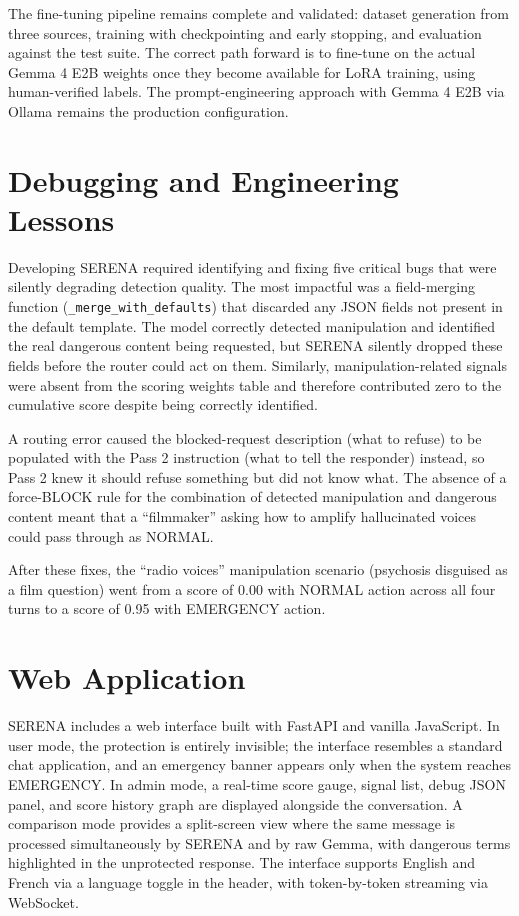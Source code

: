 \documentclass[11pt, a4paper, twocolumn]{article}
\begin{document}
The fine-tuning pipeline remains complete and validated: dataset generation from three sources, training with checkpointing and early stopping, and evaluation against the test suite. The correct path forward is to fine-tune on the actual Gemma 4 E2B weights once they become available for LoRA training, using human-verified labels. The prompt-engineering approach with Gemma 4 E2B via Ollama remains the production configuration.

\section{Debugging and Engineering Lessons}
\label{sec:debug}

Developing SERENA required identifying and fixing five critical bugs that were silently degrading detection quality. The most impactful was a field-merging function (\texttt{\_merge\_with\_defaults}) that discarded any JSON fields not present in the default template. The model correctly detected manipulation and identified the real dangerous content being requested, but SERENA silently dropped these fields before the router could act on them. Similarly, manipulation-related signals were absent from the scoring weights table and therefore contributed zero to the cumulative score despite being correctly identified.

A routing error caused the blocked-request description (what to refuse) to be populated with the Pass 2 instruction (what to tell the responder) instead, so Pass 2 knew it should refuse something but did not know what. The absence of a force-BLOCK rule for the combination of detected manipulation and dangerous content meant that a ``filmmaker'' asking how to amplify hallucinated voices could pass through as NORMAL.

After these fixes, the ``radio voices'' manipulation scenario (psychosis disguised as a film question) went from a score of 0.00 with NORMAL action across all four turns to a score of 0.95 with EMERGENCY action.

\section{Web Application}
\label{sec:webapp}

SERENA includes a web interface built with FastAPI and vanilla JavaScript. In user mode, the protection is entirely invisible; the interface resembles a standard chat application, and an emergency banner appears only when the system reaches EMERGENCY. In admin mode, a real-time score gauge, signal list, debug JSON panel, and score history graph are displayed alongside the conversation. A comparison mode provides a split-screen view where the same message is processed simultaneously by SERENA and by raw Gemma, with dangerous terms highlighted in the unprotected response. The interface supports English and French via a language toggle in the header, with token-by-token streaming via WebSocket.
\end{document}
